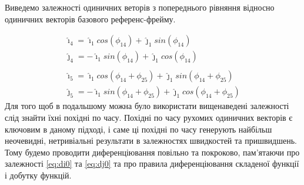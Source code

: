 \documentclass[12pt]{article}
\begin{document}
 	Виведемо залежності одиничних веторів з попереднього рівняння відносно одиничних векторів базового референс-фрейму.

 	\begin{gather}
 	\hat{\imath}_{4} = 	\hat{\imath}_{1} cos (\phi_{14}) + \hat{\jmath}_{1} sin (\phi_{14}) \label{eq:i4} \\
 	\hat{\jmath}_{4} = -\hat{\imath}_{1} sin (\phi_{14}) + \hat{\jmath}_{1} cos (\phi_{14}) \label{eq:j4} \\
 	\nonumber \\
 	\hat{\imath}_{5} = 	\hat{\imath}_{1} cos (\phi_{14} + \phi_{25}) + \hat{\jmath}_{1} sin (\phi_{14} + \phi_{25}) \label{eq:i5} \\
 	\hat{\jmath}_{5} = -\hat{\imath}_{1} sin (\phi_{14} + \phi_{25}) + \hat{\jmath}_{1} cos (\phi_{14} + \phi_{25}) \label{eq:j5}
 	\end{gather}
 	Для того щоб в подальшому можна було використати вищенаведені залежності слід знайти їхні похідні по часу. Похідні по часу рухомих одиничних векторів є ключовим в даному підході, і саме ці похідні по часу генерують найбільш неочевидні, нетривіальні результати в залежностях швидкостей та пришвидшень. Тому будемо проводити диференціювання повільно та покроково, пам'ятаючи про залежності \ref{eq:di0} та \ref{eq:dj0} та про правила диференціювання складеної функції і добутку функцій.
 	
\end{document}
